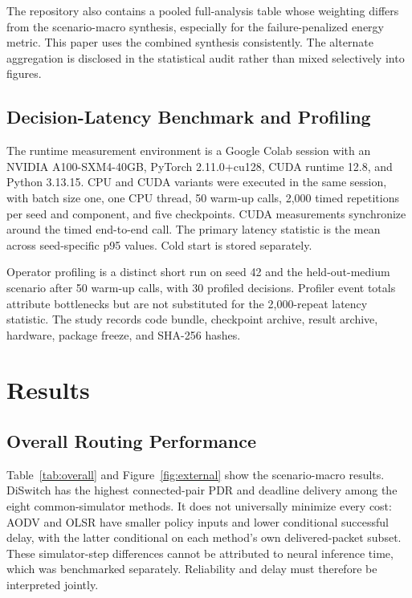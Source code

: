 \documentclass[drones,article,submit,moreauthors]{Definitions/mdpi}
\newcommand{\DS}{DiSwitch}\newcommand{\FastDS}{Fast-DiSwitch}
\newif\ifreviewmarks
\newcommand{\DeleteCandidate}[2]{\ifreviewmarks\par\noindent{\color{ReviewRed}\textbf{Deletion/move candidate #1.} #2}\par\fi}
\begin{document}
The repository also contains a pooled full-analysis table whose weighting differs from the scenario-macro synthesis, especially for the failure-penalized energy metric. This paper uses the combined synthesis consistently. The alternate aggregation is disclosed in the statistical audit rather than mixed selectively into figures.

\subsection{Decision-Latency Benchmark and Profiling}

The runtime measurement environment is a Google Colab session with an NVIDIA A100-SXM4-40GB, PyTorch 2.11.0+cu128, CUDA runtime 12.8, and Python 3.13.15. CPU and CUDA variants were executed in the same session, with batch size one, one CPU thread, 50 warm-up calls, 2,000 timed repetitions per seed and component, and five checkpoints. CUDA measurements synchronize around the timed end-to-end call. The primary latency statistic is the mean across seed-specific p95 values. Cold start is stored separately.

Operator profiling is a distinct short run on seed 42 and the held-out-medium scenario after 50 warm-up calls, with 30 profiled decisions. Profiler event totals attribute bottlenecks but are not substituted for the 2,000-repeat latency statistic. The study records code bundle, checkpoint archive, result archive, hardware, package freeze, and SHA-256 hashes. \DeleteCandidate{D05}{An attempted expanded rerun for additional p90, maximum, coefficient-of-variation, and peak-device-memory fields was interrupted when the backend reclaimed the session; no values are imputed from that failed job.}

\section{Results}

\subsection{Overall Routing Performance}

Table~\ref{tab:overall} and Figure~\ref{fig:external} show the scenario-macro results. \DS{} has the highest connected-pair PDR and deadline delivery among the eight common-simulator methods. It does not universally minimize every cost: AODV and OLSR have smaller policy inputs and lower conditional successful delay, with the latter conditional on each method's own delivered-packet subset. These simulator-step differences cannot be attributed to neural inference time, which was benchmarked separately. Reliability and delay must therefore be interpreted jointly.
\end{document}
